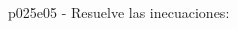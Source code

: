 \documentclass[spanish, 11pt]{exam}
\begin{document}
\begin{questions}
\begin{multicols}{1}
\begin{parts}
        \end{parts}
        \end{multicols}
        \question p025e05 - Resuelve las inecuaciones:
        \begin{multicols}{2} 
        \begin{parts} \part[1]  $ ( {x - 1} )( {x + 2} )( {x - 3} ) \geq 0 $  \begin{solution}  $ \left[-2, 1\righ
\end{multicols}
\end{questions}
\end{document}

